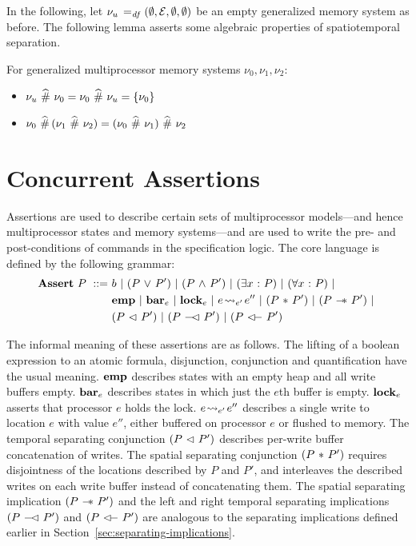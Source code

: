 \documentclass[11pt]{report}         %
\begin{document}
In the following, let $\nu_u \operatorname{\;=_{\mathit{df}}\;} (\operatorname{\emptyset}, \mathcal{E}, \operatorname{\emptyset}, \operatorname{\emptyset})$ be an empty generalized memory system as before. The following lemma asserts some algebraic properties of spatiotemporal separation. \begin{proposition}
  \label{lem:spatiotemporal-separation-algebra}
  For generalized multiprocessor memory systems $\nu_0, \nu_1, \nu_2$: 
  \begin{itemize}
    \item $\nu_u \operatorname{\,\widehat{\#}\,} \nu_0 = \nu_0 \operatorname{\,\widehat{\#}\,} \nu_u = \left\lbrace \nu_0 \right\rbrace$
    \item $\nu_0 \operatorname{\,\widehat{\#}\,} (\nu_1 \operatorname{\,\widehat{\#}\,} \nu_2) = (\nu_0 \operatorname{\,\widehat{\#}\,} \nu_1) \operatorname{\,\widehat{\#}\,} \nu_2$
  \end{itemize}
\end{proposition}

\section{Concurrent Assertions}
\label{sec:assertions}
\label{sec:multiprocessor-assertions}

Assertions are used to describe certain sets of multiprocessor models---and hence multiprocessor states and memory systems---and are used to write the pre- and post-conditions of commands in the specification logic. The core language is defined by the following grammar: \begin{align*}
      \asserts~P \bnfdef & b \bnfbar (P \disj P') \bnfbar (P \conj P') \bnfbar (\exists x \st P) \bnfbar (\forall x \st P) \bnfbar \\
      & \femp \bnfbar \fbar{e} \bnfbar \flock{e} \bnfbar e \fwrite{e'} e'' \bnfbar (P \fsep P') \bnfbar (P \fsepi P')  \bnfbar \\ 
      &  (P \fseq P') \bnfbar (P \fseqli P') \bnfbar (P \fseqri P')
\end{align*} 

The informal meaning of these assertions are as follows. The lifting of a boolean expression to an atomic formula, disjunction, conjunction and quantification have the usual meaning. $\mathbf{emp}$ describes states with an empty heap and all write buffers empty. $\mathbf{bar}_{e}$ describes states in which just the $e$th buffer is empty. $\mathbf{lock}_{e}$ asserts that processor $e$ holds the lock. $e \!\leadsto_{e'}\! e''$ describes a single write to location $e$ with value $e''$, either buffered on processor $e$ or flushed to memory. The temporal separating conjunction $(P \operatorname{\,\vartriangleleft\,} P')$ describes per-write buffer concatenation of writes. The spatial separating conjunction $(P \operatorname{\,\ast\,} P')$ requires disjointness of the locations described by $P$ and $P'$, and interleaves the described writes on each write buffer instead of concatenating them. The spatial separating implication $(P \fsepi P')$ and the left and right temporal separating implications $(P \fseqli P')$ and $(P \fseqri P')$ are analogous to the separating implications defined earlier in Section~\ref{sec:separating-implications}. 
\end{document}
